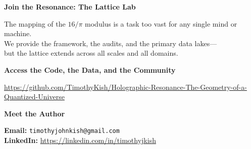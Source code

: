 \documentclass[11pt, letterpaper, openany]{book}
\begin{document}
\begin{center}
{\Huge \textbf{Join the Resonance: The Lattice Lab}}\


{\large
The mapping of the $16/\pi$ modulus is a task too vast for any single mind or machine.\\
We provide the framework, the audits, and the primary data lakes—\\
but the lattice extends across all scales and all domains.
}\


{\Large \textbf{Access the Code, the Data, and the Community}}\


{\large
\url{https://github.com/TimothyKish/Holographic-Resonance-The-Geometry-of-a-Quantized-Universe}
}\


{\Large \textbf{Meet the Author}}\


{\large
\textbf{Email:} \texttt{timothyjohnkish@gmail.com}\\
\textbf{LinkedIn:} \url{https://linkedin.com/in/timothyjkish}
}
\end{center}
\end{document}
